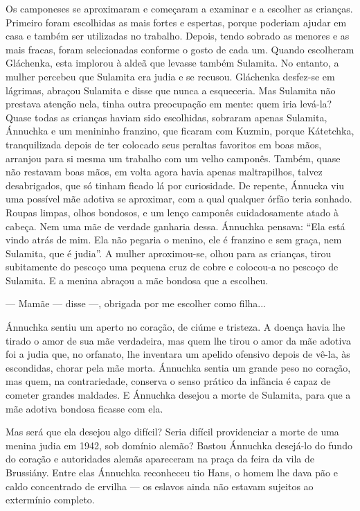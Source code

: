 Os camponeses se aproximaram e começaram a examinar e a escolher as
crianças. Primeiro foram escolhidas as mais fortes e espertas, porque
poderiam ajudar em casa e também ser utilizadas no trabalho. Depois,
tendo sobrado as menores e as mais fracas, foram selecionadas conforme o
gosto de cada um. Quando escolheram Gláchenka, esta implorou à aldeã que
levasse também Sulamita. No entanto, a mulher percebeu que Sulamita era
judia e se recusou. Gláchenka desfez-se em lágrimas, abraçou Sulamita e
disse que nunca a esqueceria. Mas Sulamita não prestava atenção nela,
tinha outra preocupação em mente: quem iria levá-la? Quase todas as
crianças haviam sido escolhidas, sobraram apenas Sulamita, Ánnuchka e um
menininho franzino, que ficaram com Kuzmin, porque Kátetchka,
tranquilizada depois de ter colocado seus peraltas favoritos em boas
mãos, arranjou para si mesma um trabalho com um velho camponês. Também,
quase não restavam boas mãos, em volta agora havia apenas maltrapilhos,
talvez desabrigados, que só tinham ficado lá por curiosidade. De
repente, Ánnucka viu uma possível mãe adotiva se aproximar, com a qual
qualquer órfão teria sonhado. Roupas limpas, olhos bondosos, e um lenço
camponês cuidadosamente atado à cabeça. Nem uma mãe de verdade ganharia
dessa. Ánnuchka pensava: ``Ela está vindo atrás de mim. Ela não pegaria
o menino, ele é franzino e sem graça, nem Sulamita, que é judia''. A
mulher aproximou-se, olhou para as crianças, tirou subitamente do
pescoço uma pequena cruz de cobre e colocou-a no pescoço de Sulamita. E
a menina abraçou a mãe bondosa que a escolheu.

--- Mamãe --- disse ---, obrigada por me escolher como filha...

Ánnuchka sentiu um aperto no coração, de ciúme e tristeza. A doença
havia lhe tirado o amor de sua mãe verdadeira, mas quem lhe tirou o amor
da mãe adotiva foi a judia que, no orfanato, lhe inventara um apelido
ofensivo depois de vê-la, às escondidas, chorar pela mãe morta. Ánnuchka
sentia um grande peso no coração, mas quem, na contrariedade, conserva o
senso prático da infância é capaz de cometer grandes maldades. E
Ánnuchka desejou a morte de Sulamita, para que a mãe adotiva bondosa
ficasse com ela.

Mas será que ela desejou algo difícil? Seria difícil providenciar a
morte de uma menina judia em 1942, sob domínio alemão? Bastou Ánnuchka
desejá-lo do fundo do coração e autoridades alemãs apareceram na praça
da feira da vila de Brussiány. Entre elas Ánnuchka reconheceu tio Hans,
o homem lhe dava pão e caldo concentrado de ervilha --- os eslavos ainda
não estavam sujeitos ao extermínio completo.

